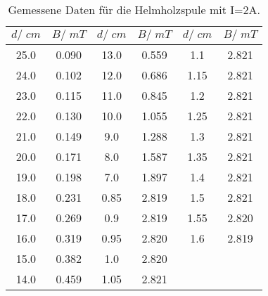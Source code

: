 \begin{table}[H]
  \centering
   \begin{tabular}{c c|c c| c c}
    \toprule
    $d /\;\si{cm}$ & $B/\;\si{mT}$ & $d /\;\si{cm}$ &
    $B/\;\si{mT}$ & $d /\;\si{cm}$ & $B/\;\si{mT}$ \\
    \midrule
    25.0 & 0.090 & 13.0 & 0.559 & 1.1 & 2.821\\
    24.0 & 0.102 & 12.0 & 0.686 & 1.15 & 2.821\\
    23.0 & 0.115 & 11.0 & 0.845 & 1.2 & 2.821\\
    22.0 & 0.130 & 10.0 & 1.055 & 1.25 & 2.821\\
    21.0 & 0.149 & 9.0 & 1.288 & 1.3 & 2.821\\
    20.0 & 0.171 & 8.0 & 1.587 & 1.35 & 2.821\\
    19.0 & 0.198 & 7.0 & 1.897 & 1.4 & 2.821\\
    18.0 & 0.231 & 0.85 & 2.819 & 1.5 & 2.821\\
    17.0 & 0.269 & 0.9 & 2.819 & 1.55 & 2.820\\
    16.0 & 0.319 & 0.95 & 2.820 & 1.6 & 2.819\\
    15.0 & 0.382 & 1.0 & 2.820\\
    14.0 & 0.459 & 1.05 & 2.821\\  
    \bottomrule
  \end{tabular}
  \caption{Gemessene Daten für die Helmholzspule mit I=2A.}
  \label{tab:tabelle3}
\end{table}
